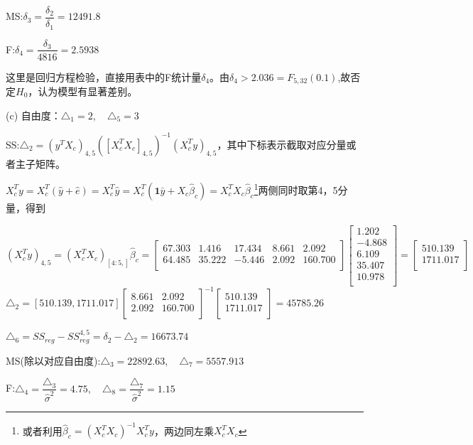 \documentclass[cn,hazy,green,12pt,normal]{elegantnote}
\numberwithin{equation}{section}
\numberwithin{subsection}{section}
\begin{document}
MS:$\delta_3 = \dfrac{\delta_2}{\delta_1}=12491.8$

F:$\delta_4 = \dfrac{\delta_3}{4816} = 2.5938$

这里是回归方程检验，直接用表中的F统计量$\delta_4$。由$\delta_4>2.036=F_{5,32}(0.1)$,故否定$H_0$，认为模型有显著差别。

\noindent (c) 自由度：$\triangle_1=2,\quad \triangle_5 = 3$

SS:$\triangle_2 = (y^TX_c)_{4,5}([X_c^TX_c]_{4,5})^{-1}(X_c^Ty)_{4,5}$，其中下标表示截取对应分量或者主子矩阵。

$X_c^T y=X_c^T(\hat{y}+\hat{e})=X_c^T\hat{y}=X_c^T(\bm 1 \bar{y} + X_c\hat{\beta}_c)=X_c^TX_c\hat{\beta}_c$\footnote{或者利用$\hat{\beta}_c = (X_c^T X_c)^{-1}X_c^Ty$，两边同左乘$X_c^T X_c$}两侧同时取第4，5分量，得到

\[(X_c^Ty)_{4,5}=(X_c^TX_c)_{[4:5,]}\hat{\beta}_c=
\begin{bmatrix}
    67.303& 1.416& 17.434& 8.661 & 2.092 \\
    64.485 & 35.222 & -5.446 & 2.092 & 160.700\\
\end{bmatrix}\begin{bmatrix}
    1.202\\
    -4.868\\
    6.109\\
    35.407\\
    10.978\\
\end{bmatrix}=\begin{bmatrix}
    510.139\\
    1711.017\\
\end{bmatrix}
\]
$\triangle_2 = [510.139,1711.017]\begin{bmatrix}
    8.661 & 2.092\\
    2.092 & 160.700\\
\end{bmatrix}^{-1}\begin{bmatrix}
    510.139\\
    1711.017\\
\end{bmatrix}=45785.26$

$\triangle_6 = SS_{reg}-SS_{reg}^{4,5}=\delta_2 - \triangle_2 = 16673.74$

MS(除以对应自由度):$\triangle_3 = 22892.63 ,\quad \triangle_7 = 5557.913$

F:$\triangle_4=\dfrac{\triangle_3}{\hat{\sigma}^2}=4.75 ,\quad \triangle_8=\dfrac{\triangle_7}{\hat{\sigma}^2}=1.15$
\end{document}
